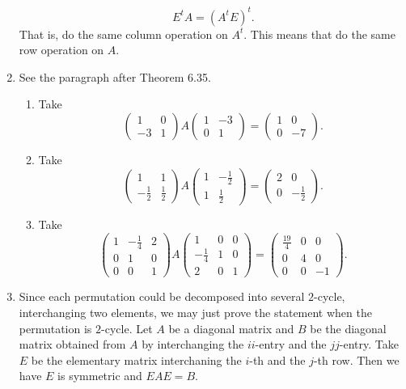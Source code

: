 \begin{enumerate}
\[E^tA=(A^tE)^t.\]
That is, do the same column operation on $A^t$. This means that do the same row operation on $A$.
\item See the paragraph after Theorem 6.35.
\begin{enumerate}
\item Take 
\[\begin{pmatrix}1&0\\-3&1\end{pmatrix}A\begin{pmatrix}1&-3\\0&1\end{pmatrix}=\begin{pmatrix}1&0\\0&-7\end{pmatrix}.\]
\item Take 
\[\begin{pmatrix}1&1\\-\frac{1}{2}&\frac{1}{2}\end{pmatrix}A\begin{pmatrix}1&-\frac{1}{2}\\1&\frac{1}{2}\end{pmatrix}=\begin{pmatrix}2&0\\0&-\frac{1}{2}\end{pmatrix}.\]
\item Take 
\[\begin{pmatrix}1&-\frac{1}{4}&2\\0&1&0\\0&0&1\end{pmatrix}A\begin{pmatrix}1&0&0\\-\frac{1}{4}&1&0\\2&0&1\end{pmatrix}=\begin{pmatrix}\frac{19}{4}&0&0\\0&4&0\\0&0&-1\end{pmatrix}.\]
\end{enumerate}
\item Since each permutation could be decomposed into several $2$-cycle, interchanging two elements, we may just prove the statement when the permutation is $2$-cycle. Let $A$ be a diagonal matrix and $B$ be the diagonal matrix obtained from $A$ by interchanging the $ii$-entry and the $jj$-entry. Take $E$ be the elementary matrix interchaning the $i$-th and the $j$-th row. Then we have $E$ is symmetric and $EAE=B$.

\end{enumerate}

